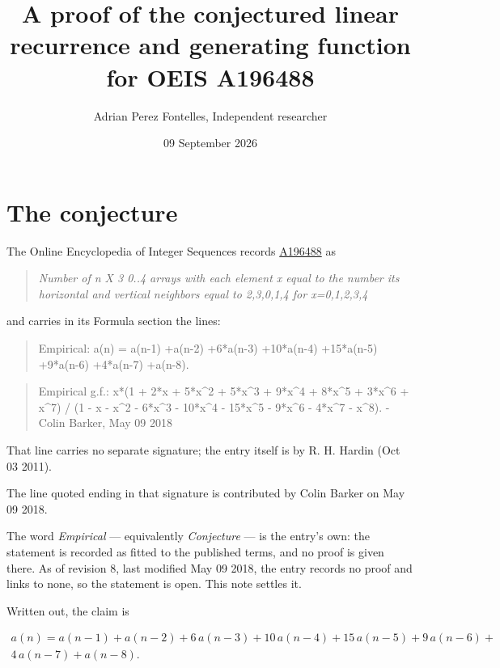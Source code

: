 \documentclass[11pt]{article}
\title{A proof of the conjectured linear recurrence and generating function for OEIS A196488}
\author{Adrian Perez Fontelles, Independent researcher}
\date{09 September 2026}
\theoremstyle{definition}
\begin{document}
\maketitle
\section{The conjecture}

The Online Encyclopedia of Integer Sequences records \href{https://oeis.org/A196488}{A196488} as

\begin{quote}\itshape Number of n X 3 0..4 arrays with each element x equal to the number its horizontal and vertical neighbors equal to 2,3,0,1,4 for x=0,1,2,3,4\end{quote}

and carries in its Formula section the lines:

\begin{quote}\ttfamily Empirical: a(n) = a(n-1) +a(n-2) +6*a(n-3) +10*a(n-4) +15*a(n-5) +9*a(n-6) +4*a(n-7) +a(n-8).\end{quote}

\begin{quote}\ttfamily Empirical g.f.: x*(1 + 2*x + 5*x\textasciicircum{}2 + 5*x\textasciicircum{}3 + 9*x\textasciicircum{}4 + 8*x\textasciicircum{}5 + 3*x\textasciicircum{}6 + x\textasciicircum{}7) / (1 - x - x\textasciicircum{}2 - 6*x\textasciicircum{}3 - 10*x\textasciicircum{}4 - 15*x\textasciicircum{}5 - 9*x\textasciicircum{}6 - 4*x\textasciicircum{}7 - x\textasciicircum{}8). - Colin Barker, May 09 2018\end{quote}

That line carries no separate signature; the entry itself is by R. H. Hardin (Oct 03 2011).

The line quoted ending in that signature is contributed by Colin Barker on May 09 2018.

The word {\itshape Empirical} --- equivalently {\itshape Conjecture} --- is the entry's own: the statement is recorded as fitted to the published terms, and no proof is given there. As of revision 8, last modified May 09 2018, the entry records no proof and links to none, so the statement is open. This note settles it.

Written out, the claim is

\begin{multline*} a(n) = a(n-1) + a(n-2) + 6\,a(n-3) + 10\,a(n-4) + 15\,a(n-5) + 9\,a(n-6) + \\ 4\,a(n-7) + a(n-8). \end{multline*}
\end{document}
